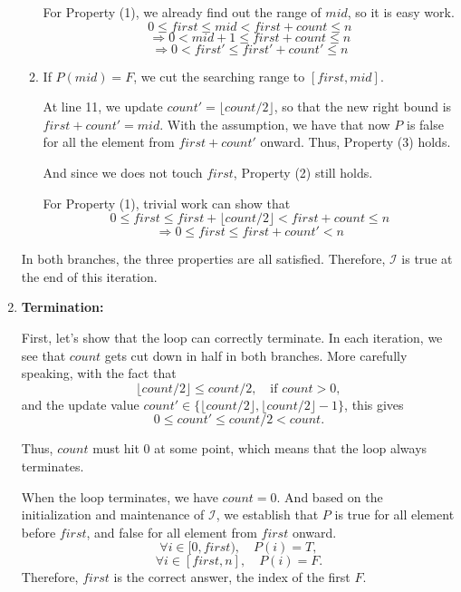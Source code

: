 \documentclass[12pt]{article}
\begin{document}
\begin{enumerate}
\begin{enumerate}
        For Property (1), we already find out the range of \(mid\), so it is easy work.
        \[
            0 \leq first \leq mid < first + count \leq n
        \]
        \[
            \Rightarrow 0 < mid + 1 \leq first + count \leq n
        \]
        \[
            \Rightarrow 0 < first' \leq first' + count' \leq n
        \]

        \item If \(P(mid) = F\), we cut the searching range to \([first, mid]\).

        At line 11, we update \(count' = \lfloor count / 2 \rfloor\), so that the new right bound is \(first + count' = mid\). With the assumption, we have that now \(P\) is false for all the element from \(first + count'\) onward. Thus, Property (3) holds.

        And since we does not touch \(first\), Property (2) still holds.

        For Property (1), trivial work can show that
        \[
            0 \leq first \leq first + \lfloor count / 2 \rfloor < first + count \leq n
        \]
        \[
            \Rightarrow 0 \leq first \leq first + count' < n
        \]
    \end{enumerate}

    In both branches, the three properties are all satisfied. Therefore, \(\mathcal{I}\) is true at the end of this iteration.

    \item \textbf{Termination:}

    First, let's show that the loop can correctly terminate. In each iteration, we see that \(count\) gets cut down in half in both branches. More carefully speaking, with the fact that
    \[
        \lfloor count / 2 \rfloor \leq count / 2, \quad \text{if } count > 0,
    \]
    and the update value \(count' \in \{\lfloor count / 2 \rfloor, \lfloor count / 2 \rfloor - 1\}\), this gives
    \[
        0 \leq count' \leq count / 2 < count.
    \]

    Thus, \(count\) must hit 0 at some point, which means that the loop always terminates.

    When the loop terminates, we have \(count = 0\). And based on the initialization and maintenance of \(\mathcal{I}\), we establish that \(P\) is true for all element before \(first\), and false for all element from \(first\) onward.
    \[
        \forall i \in [0, first), \quad P(i) = T,
    \]
    \[
        \forall i \in [first, n], \quad P(i) = F.
    \]
    Therefore, \(first\) is the correct answer, the index of the first \(F\).
\end{enumerate}
\end{document}
